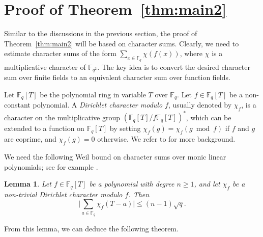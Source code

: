 \documentclass[12pt,reqno]{amsart}
\newtheorem{lem}[thm]{Lemma}
\theoremstyle{definition}
\newcommand{\F}{\mathbb{F}}
\begin{document}
\section{Proof of Theorem~\ref{thm:main2}}\label{sec3}

Similar to the discussions in the previous section, the proof of Theorem~\ref{thm:main2} will be based on character sums. Clearly, we need to estimate character sums of the form $\sum_{x \in \F_q} \chi(f(x))$, where $\chi$ is a multiplicative character of $\F_{q^2}$. The key idea is to convert the desired character sum over finite fields to an equivalent character sum over function fields. 

Let $\F_q[T]$ be the polynomial ring in variable $T$ over $\F_q$. Let $f \in \F_q[T]$ be a non-constant polynomial. A \emph{Dirichlet character modulo $f$}, usually denoted by $\chi_f$, is a character on the multiplicative group $(\F_q[T]/f\F_q[T])^*$, which can be extended to a function on $\F_q[T]$ by setting $\chi_f(g)=\chi_f(g \bmod f)$ if $f$ and $g$ are coprime, and $\chi_f(g)=0$ otherwise. We refer to \cite[Section 4]{R02} for more background.

We need the following Weil bound on character sums over monic linear polynomials; see for example \cite[Theorem 2.1]{W97}.

\begin{lem}\label{lem:FF}
Let $f \in \F_q[T]$ be a polynomial with degree $n \geq 1$, and let $\chi_f$ be a non-trivial Dirichlet character modulo $f$. Then
$$
\bigg|\sum_{a \in \F_q} \chi_{f}(T-a)\bigg|\leq (n-1)\sqrt{q}.
$$
\end{lem}

From this lemma, we can deduce the following theorem.
\end{document}
